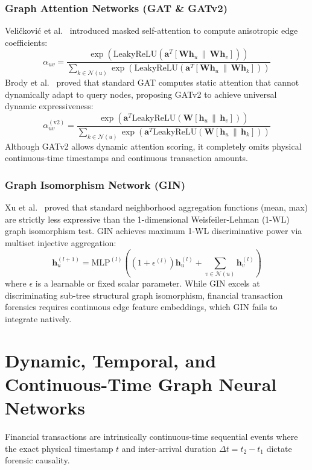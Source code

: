 \subsubsection{Graph Attention Networks (GAT \& GATv2)}
Veli\v{c}kovi\'{c} et al.~\cite{velickovic2018graph} introduced masked self-attention to compute anisotropic edge coefficients:
\begin{equation}
\alpha_{uv} = \frac{\exp\left( \text{LeakyReLU}\left( \mathbf{a}^T [\mathbf{W}\mathbf{h}_u \,\|\, \mathbf{W}\mathbf{h}_v] \right) \right)}{\sum_{k \in \mathcal{N}(u)} \exp\left( \text{LeakyReLU}\left( \mathbf{a}^T [\mathbf{W}\mathbf{h}_u \,\|\, \mathbf{W}\mathbf{h}_k] \right) \right)}
\end{equation}
Brody et al.~\cite{brody2022how} proved that standard GAT computes static attention that cannot dynamically adapt to query nodes, proposing GATv2 to achieve universal dynamic expressiveness:
\begin{equation}
\alpha_{uv}^{(\text{v2})} = \frac{\exp\left( \mathbf{a}^T \text{LeakyReLU}\left( \mathbf{W}[\mathbf{h}_u \,\|\, \mathbf{h}_v] \right) \right)}{\sum_{k \in \mathcal{N}(u)} \exp\left( \mathbf{a}^T \text{LeakyReLU}\left( \mathbf{W}[\mathbf{h}_u \,\|\, \mathbf{h}_k] \right) \right)}
\end{equation}
Although GATv2 allows dynamic attention scoring, it completely omits physical continuous-time timestamps and continuous transaction amounts.

\subsubsection{Graph Isomorphism Network (GIN)}
Xu et al.~\cite{xu2019powerful} proved that standard neighborhood aggregation functions (mean, max) are strictly less expressive than the 1-dimensional Weisfeiler-Lehman (1-WL) graph isomorphism test. GIN achieves maximum 1-WL discriminative power via multiset injective aggregation:
\begin{equation}
\mathbf{h}_u^{(l+1)} = \text{MLP}^{(l)}\left( \left(1 + \epsilon^{(l)}\right) \mathbf{h}_u^{(l)} + \sum_{v \in \mathcal{N}(u)} \mathbf{h}_v^{(l)} \right)
\end{equation}
where $\epsilon$ is a learnable or fixed scalar parameter. While GIN excels at discriminating sub-tree structural graph isomorphism, financial transaction forensics requires continuous edge feature embeddings, which GIN fails to integrate natively.

\section{Dynamic, Temporal, and Continuous-Time Graph Neural Networks}
Financial transactions are intrinsically continuous-time sequential events where the exact physical timestamp $t$ and inter-arrival duration $\Delta t = t_2 - t_1$ dictate forensic causality.

